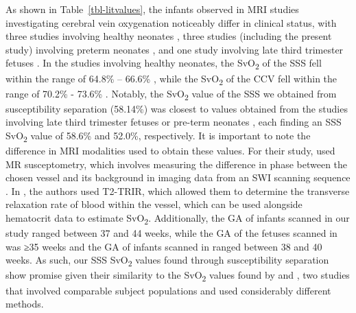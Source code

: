 \documentclass[
true
]{sn-jnl}
\begin{document}
As shown in Table~\ref{tbl-litvalues}, the infants observed in MRI
studies investigating cerebral vein oxygenation noticeably differ in
clinical status, with three studies involving healthy neonates
\citep{weberQuantitativeSusceptibilityMapping2021, gouAutomaticRejectionBased2024, jiangVesselspecificQuantificationNeonatal2019},
three studies (including the present study) involving preterm neonates
\citep{weberQuantitativeSusceptibilityMapping2021, devisNoninvasiveMRIMeasurements2014},
and one study involving late third trimester fetuses
\citep{portnoyHumanUmbilicalCord2018}. In the studies involving healthy
neonates, the SvO\textsubscript{2} of the SSS fell within the range of
64.8\% -- 66.6\%
\citep{gouAutomaticRejectionBased2024, jiangVesselspecificQuantificationNeonatal2019},
while the SvO\textsubscript{2} of the CCV fell within the range of
70.2\% - 73.6\%
\citep{weberQuantitativeSusceptibilityMapping2021, jiangVesselspecificQuantificationNeonatal2019}.
Notably, the SvO\textsubscript{2} value of the SSS we obtained from
susceptibility separation (58.14\%) was closest to values obtained from
the studies involving late third trimester fetuses
\citep{yadavImagingPutativeFoetal2018} or pre-term neonates
\citep{devisNoninvasiveMRIMeasurements2014}, each finding an SSS
SvO\textsubscript{2} value of 58.6\% and 52.0\%, respectively. It is
important to note the difference in MRI modalities used to obtain these
values. For their study, \citet{yadavImagingPutativeFoetal2018} used MR
susceptometry, which involves measuring the difference in phase between
the chosen vessel and its background in imaging data from an SWI
scanning sequence \citep{yadavImagingPutativeFoetal2018}. In
\citet{devisNoninvasiveMRIMeasurements2014}, the authors used T2-TRIR,
which allowed them to determine the transverse relaxation rate of blood
within the vessel, which can be used alongside hematocrit data to
estimate SvO\textsubscript{2}. Additionally, the GA of infants scanned
in our study ranged between 37 and 44 weeks, while the GA of the fetuses
scanned in \citet{yadavImagingPutativeFoetal2018} was ≥35 weeks and the
GA of infants scanned in \citet{devisNoninvasiveMRIMeasurements2014}
ranged between 38 and 40 weeks. As such, our SSS SvO\textsubscript{2}
values found through susceptibility separation show promise given their
similarity to the SvO\textsubscript{2} values found by
\citet{yadavImagingPutativeFoetal2018} and
\citet{devisNoninvasiveMRIMeasurements2014}, two studies that involved
comparable subject populations and used considerably different methods.
\end{document}
